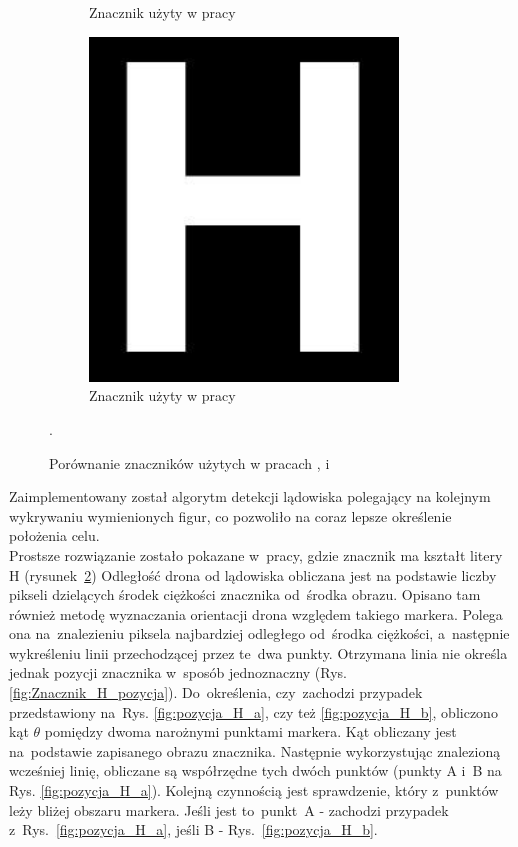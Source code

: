 \begin{figure}
\begin{subfigure}{0.3\textwidth}
		\caption{Znacznik użyty w pracy \cite{Falanga}}
		\label{fig:znacznik_falanga}
	\end{subfigure}%
	\begin{subfigure}{0.3\textwidth}
		\centering
		\includegraphics[width=0.9\textwidth]{znacznik_H.jpg}
		\caption{Znacznik użyty w pracy \cite{H}}
		\label{fig:znacznik_H}
	\end{subfigure}
	\caption{Porównanie znaczników użytych w pracach \cite{Rings},\cite{Falanga} i \cite{H}}.
	\label{fig:Znaczniki}
\end{figure}
Zaimplementowany został algorytm detekcji lądowiska polegający na kolejnym wykrywaniu wymienionych figur, co pozwoliło na coraz lepsze określenie położenia celu.\\
Prostsze rozwiązanie zostało pokazane w~pracy\cite{H}, gdzie znacznik ma kształt litery H (rysunek~\ref{fig:znacznik_H}) 
Odległość drona od lądowiska obliczana jest na podstawie liczby pikseli dzielących środek ciężkości znacznika od~środka obrazu. 
Opisano tam również metodę wyznaczania orientacji drona względem takiego markera. Polega ona na~znalezieniu piksela najbardziej odległego od~środka ciężkości, a~następnie wykreśleniu linii przechodzącej przez te~dwa punkty. Otrzymana linia nie określa jednak pozycji znacznika w~sposób jednoznaczny (Rys. \ref{fig:Znacznik_H_pozycja}). Do~określenia, czy~zachodzi przypadek przedstawiony na~Rys. \ref{fig:pozycja_H_a}, czy też \ref{fig:pozycja_H_b}, obliczono kąt $\theta$ pomiędzy dwoma narożnymi punktami markera. Kąt obliczany jest na~podstawie zapisanego obrazu znacznika. Następnie wykorzystując znalezioną wcześniej linię, obliczane są współrzędne tych dwóch punktów (punkty A i~B na Rys. \ref{fig:pozycja_H_a}). Kolejną czynnością jest sprawdzenie, który z~punktów leży bliżej obszaru markera. Jeśli jest to~punkt~A - zachodzi przypadek z~Rys.~\ref{fig:pozycja_H_a}, jeśli B - Rys.~\ref{fig:pozycja_H_b}.\\ %
